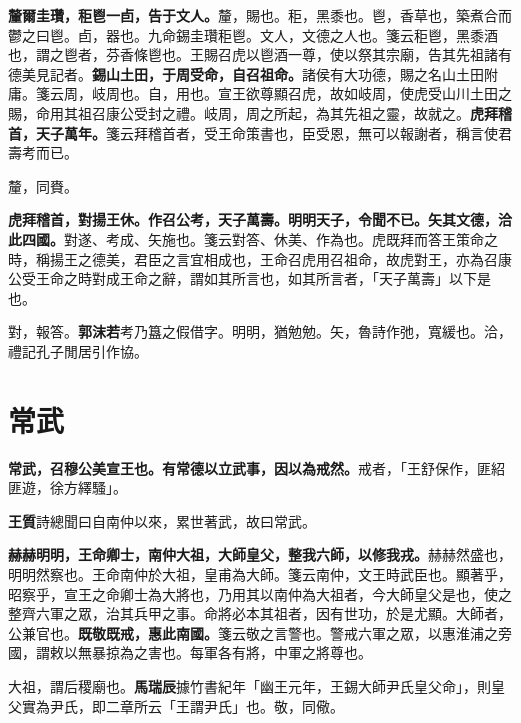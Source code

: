 \textbf{釐爾圭瓚，秬鬯一卣，告于文人。}{\footnotesize 釐，賜也。秬，黑黍也。鬯，香草也，築煮合而鬱之曰鬯。卣，器也。九命錫圭瓚秬鬯。文人，文德之人也。箋云秬鬯，黑黍酒也，謂之鬯者，芬香條鬯也。王賜召虎以鬯酒一尊，使以祭其宗廟，告其先祖諸有德美見記者。}\textbf{錫山土田，于周受命，自召祖命。}{\footnotesize 諸侯有大功德，賜之名山土田附庸。箋云周，岐周也。自，用也。宣王欲尊顯召虎，故如岐周，使虎受山川土田之賜，命用其祖召康公受封之禮。岐周，周之所起，為其先祖之靈，故就之。}\textbf{虎拜稽首，天子萬年。}{\footnotesize 箋云拜稽首者，受王命策書也，臣受恩，無可以報謝者，稱言使君壽考而已。}

\begin{quoting}釐，同賚。\end{quoting}

\textbf{虎拜稽首，對揚王休。作召公考，天子萬壽。明明天子，令聞不已。矢其文德，洽此四國。}{\footnotesize 對遂、考成、矢施也。箋云對答、休美、作為也。虎既拜而答王策命之時，稱揚王之德美，君臣之言宜相成也，王命召虎用召祖命，故虎對王，亦為召康公受王命之時對成王命之辭，謂如其所言也，如其所言者，「天子萬壽」以下是也。}

\begin{quoting}對，報答。\textbf{郭沫若}考乃簋之假借字。明明，猶勉勉。矢，魯詩作弛，寬緩也。洽，禮記孔子閒居引作協。\end{quoting}

\section{常武}


\textbf{常武，召穆公美宣王也。有常德以立武事，因以為戒然。}{\footnotesize 戒者，「王舒保作，匪紹匪遊，徐方繹騷」。}

\begin{quoting}\textbf{王質}詩總聞曰自南仲以來，累世著武，故曰常武。\end{quoting}

\textbf{赫赫明明，王命卿士，南仲大祖，大師皇父，整我六師，以修我戎。}{\footnotesize 赫赫然盛也，明明然察也。王命南仲於大祖，皇甫為大師。箋云南仲，文王時武臣也。顯著乎，昭察乎，宣王之命卿士為大將也，乃用其以南仲為大祖者，今大師皇父是也，使之整齊六軍之眾，治其兵甲之事。命將必本其祖者，因有世功，於是尤顯。大師者，公兼官也。}\textbf{既敬既戒，惠此南國。}{\footnotesize 箋云敬之言警也。警戒六軍之眾，以惠淮浦之旁國，謂敕以無暴掠為之害也。每軍各有將，中軍之將尊也。}

\begin{quoting}大祖，謂后稷廟也。\textbf{馬瑞辰}據竹書紀年「幽王元年，王錫大師尹氏皇父命」，則皇父實為尹氏，即二章所云「王謂尹氏」也。敬，同儆。\end{quoting}

